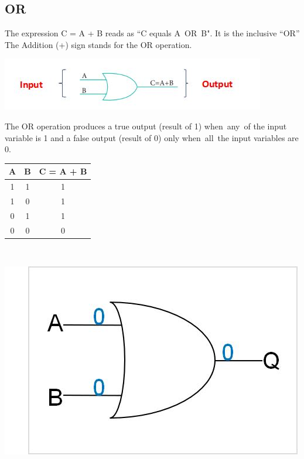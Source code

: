 \documentclass{article}
\begin{document}
\subsection{OR}
The expression C = A + B reads as “C equals A OR B". It is the inclusive “OR”
The Addition (+) sign stands for the OR operation. \\
\begin{center}\includegraphics{7}\end{center}

The OR operation produces a true output (result of 1) when any of the input variable is 1 and a false output (result of 0) only when all the input variables are 0. \\
\begin{table}[h!]
	\begin{center}
		\begin{tabular}{c|c|c}
			\textbf{A} & \textbf{B} &
			\textbf{C = A + B}\\
			\hline
			\cellcolor{blue!20}1 & \cellcolor{blue!20}1 & \cellcolor{blue!20}1\\
			\hline
			\cellcolor{blue!30}1 & \cellcolor{blue!30}0 & \cellcolor{blue!30}1\\
			\hline
			\cellcolor{blue!20}0 & \cellcolor{blue!20}1 & \cellcolor{blue!20}1\\
			\hline
			\cellcolor{blue!30}0 & \cellcolor{blue!30}0 & \cellcolor{blue!30}0\\
			\hline
		\end{tabular}
	\end{center}
\end{table} \\ 
\begin{center}
	\includegraphics{9} 
\end{center}
\end{document}
